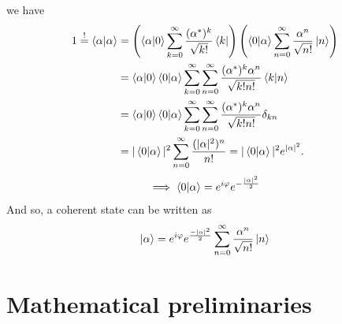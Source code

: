\documentclass[12pt, a4paper,  nobibnotes]{article}
\begin{document}
we have 
\begin{align*}
    1\overset{!}{=} \braket{\alpha|\alpha} & = 
    \left(\braket{\alpha|0}\sum\limits_{k=0}^{\infty}\frac{(\alpha^*)^k}{\sqrt{k!}}\bra k\right)
    \left(\braket{0|\alpha}\sum\limits_{n=0}^{\infty}\frac{\alpha^n}{\sqrt{n!}}\ket n\right)\\
    &=\braket{\alpha|0}\braket{0|\alpha}\sum\limits_{k=0}^{\infty} \sum\limits_{n=0}^{\infty}
    \frac{(\alpha^*)^k\alpha^n}{\sqrt{k!n!}}\braket{k|n} \\
    &=\braket{\alpha|0}\braket{0|\alpha}\sum\limits_{k=0}^{\infty} \sum\limits_{n=0}^{\infty}
    \frac{(\alpha^*)^k\alpha^n}{\sqrt{k!n!}}\delta_{kn}\\
    &= |\braket{0|\alpha}|^2 \sum\limits_{n=0}^{\infty} \frac{(|\alpha|^2)^n}{n!} = |\braket{0|\alpha}|^2e^{|\alpha|^2}.
\end{align*}
\begin{equation*}
    \implies \braket{0|\alpha} = e^{i\varphi}e^{-\frac{|\alpha|^2}{2}}
\end{equation*}
And so, a coherent state can be written as 
\begin{equation*}
    \ket\alpha = e^{i\varphi}e^{\frac{-|\alpha|^2}{2}}\sum\limits_{n=0}^{\infty}\frac{\alpha^n}{\sqrt{n!}}\ket n
\end{equation*}
\section{Mathematical preliminaries}
\label{appendix:mathematical-preliminaries}
\end{document}
